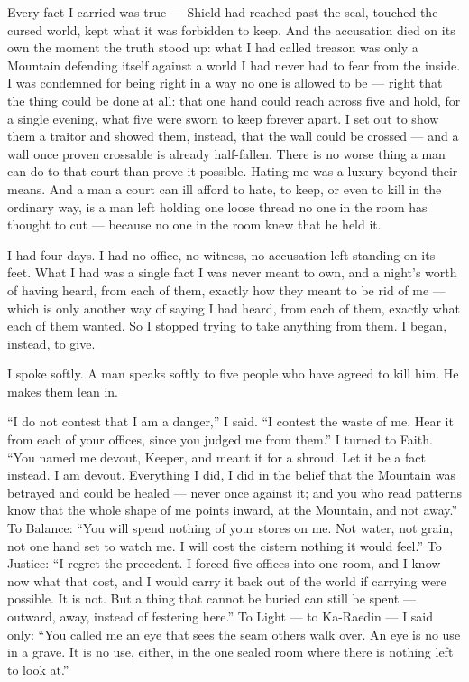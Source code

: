 \ornament
 
 
Every fact I carried was true --- Shield had reached past the seal, touched the cursed world, kept what it was forbidden to keep. And the accusation died on its own the moment the truth stood up: what I had called treason was only a Mountain defending itself against a world I had never had to fear from the inside. I was condemned for being right in a way no one is allowed to be --- right that the thing could be done at all: that one hand could reach across five and hold, for a single evening, what five were sworn to keep forever apart. I set out to show them a traitor and showed them, instead, that the wall could be crossed --- and a wall once proven crossable is already half-fallen. There is no worse thing a man can do to that court than prove it possible. Hating me was a luxury beyond their means. And a man a court can ill afford to hate, to keep, or even to kill in the ordinary way, is a man left holding one loose thread no one in the room has thought to cut --- because no one in the room knew that he held it.\par

\ornament

I had four days. I had no office, no witness, no accusation left standing on its feet. What I had was a single fact I was never meant to own, and a night's worth of having heard, from each of them, exactly how they meant to be rid of me --- which is only another way of saying I had heard, from each of them, exactly what each of them wanted. So I stopped trying to take anything from them. I began, instead, to give.\par

I spoke softly. A man speaks softly to five people who have agreed to kill him. He makes them lean in.\par

``I do not contest that I am a danger,'' I said. ``I contest the waste of me. Hear it from each of your offices, since you judged me from them.'' I turned to Faith. ``You named me devout, Keeper, and meant it for a shroud. Let it be a fact instead. I am devout. Everything I did, I did in the belief that the Mountain was betrayed and could be healed --- never once against it; and you who read patterns know that the whole shape of me points inward, at the Mountain, and not away.'' To Balance: ``You will spend nothing of your stores on me. Not water, not grain, not one hand set to watch me. I will cost the cistern nothing it would feel.'' To Justice: ``I regret the precedent. I forced five offices into one room, and I know now what that cost, and I would carry it back out of the world if carrying were possible. It is not. But a thing that cannot be buried can still be spent --- outward, away, instead of festering here.'' To Light --- to Ka-Raedin --- I said only: ``You called me an eye that sees the seam others walk over. An eye is no use in a grave. It is no use, either, in the one sealed room where there is nothing left to look at.''\par

